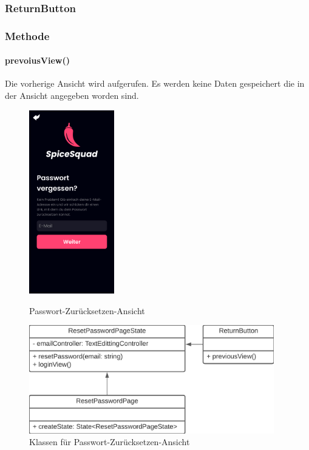 \documentclass{entwurfsheft}
\begin{document}
\subsubsection{ReturnButton}\label{sec:ReturnButton}
\subsubsection*{Methode}
\paragraph*{prevoiusView()} Die vorherige Ansicht wird aufgerufen. Es werden keine Daten gespeichert die in der Ansicht angegeben worden sind.

\begin{figure}[htp]
    \begin{minipage}
        [t]{0.49\textwidth}
        \centering
        \includegraphics[height=80mm]{images/Presentation-layer/PasswordResetView.jpg}
        \caption{Passwort-Zurücksetzen-Ansicht}
    \end{minipage}
    \begin{minipage}
        [t]{0.49\textwidth}
        \centering
        \includegraphics[width=0.95\textwidth]{images/Presentation-layer/PasswordResetViewClass.png}
        \caption{Klassen für Passwort-Zurücksetzen-Ansicht}
    \end{minipage}
\end{figure}
\end{document}
